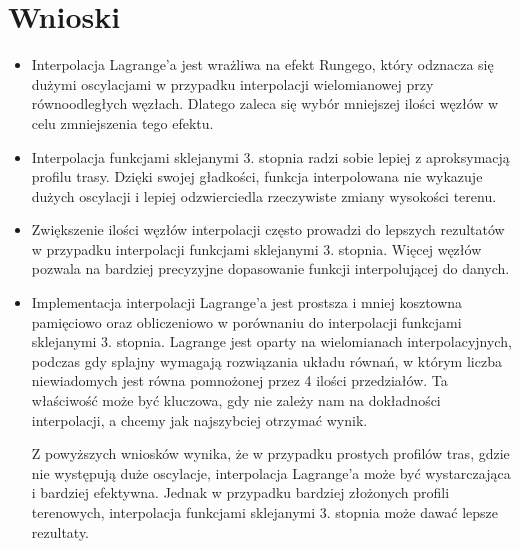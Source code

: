 \documentclass{article}
\begin{document}
\newpage

\section{Wnioski}

\begin{itemize}
    \item Interpolacja Lagrange'a jest wrażliwa na efekt Rungego, 
    który odznacza się dużymi oscylacjami w przypadku interpolacji 
    wielomianowej przy równoodległych węzłach. Dlatego zaleca się wybór 
    mniejszej ilości węzłów w celu zmniejszenia tego efektu.

    \item Interpolacja funkcjami sklejanymi 3. stopnia radzi sobie 
    lepiej z aproksymacją profilu trasy. Dzięki swojej gładkości, funkcja 
    interpolowana nie wykazuje dużych oscylacji i lepiej odzwierciedla 
    rzeczywiste zmiany wysokości terenu.

    \item Zwiększenie ilości węzłów interpolacji często prowadzi do lepszych rezultatów 
    w przypadku interpolacji funkcjami sklejanymi 3. stopnia. Więcej węzłów 
    pozwala na bardziej precyzyjne dopasowanie funkcji interpolującej do danych.

    \item Implementacja interpolacji Lagrange'a jest prostsza i mniej 
    kosztowna pamięciowo oraz obliczeniowo w porównaniu do interpolacji 
    funkcjami sklejanymi 3. stopnia. Lagrange jest oparty na wielomianach 
    interpolacyjnych, podczas gdy splajny wymagają rozwiązania układu równań,
    w którym liczba niewiadomych jest równa pomnożonej przez 4 ilości przedziałów.
    Ta właściwość może być kluczowa, gdy nie zależy nam na dokładności interpolacji,
    a chcemy jak najszybciej otrzymać wynik.

    Z powyższych wniosków wynika, że w przypadku prostych profilów tras, 
    gdzie nie występują duże oscylacje, interpolacja Lagrange'a 
    może być wystarczająca i bardziej efektywna. Jednak w przypadku 
    bardziej złożonych profili terenowych, interpolacja funkcjami 
    sklejanymi 3. stopnia może dawać lepsze rezultaty.
\end{itemize}
\end{document}
